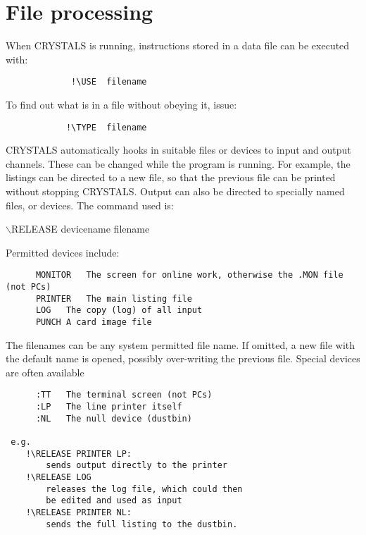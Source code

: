 \documentclass[10pt,a4paper]{report}
\begin{document}
\section{File processing}


When CRYSTALS is running, instructions stored in a data file can be executed
 with:

\small\begin{verbatim}
             !\USE  filename
\end{verbatim}\normalsize




To find out what is in a file without obeying it, issue:

\small\begin{verbatim}
            !\TYPE  filename
\end{verbatim}\normalsize




CRYSTALS automatically hooks in suitable files or devices to input and output
 channels. These can be changed while the program is running. For example, the
 listings can be directed to a new file, so that the previous file can be
 printed without stopping CRYSTALS. Output can also be directed to specially
 named files, or devices. The command used is:



$\backslash$RELEASE devicename filename


Permitted devices include:

\small\begin{verbatim}
      MONITOR   The screen for online work, otherwise the .MON file (not PCs)
      PRINTER   The main listing file
      LOG   The copy (log) of all input
      PUNCH A card image file
\end{verbatim}\normalsize




The filenames can be any system permitted file name.
 If omitted, a new file with the  default name is opened, possibly
 over-writing the previous file.
 Special devices are often available

\small\begin{verbatim}
      :TT   The terminal screen (not PCs)
      :LP   The line printer itself
      :NL   The null device (dustbin)

 e.g.
    !\RELEASE PRINTER LP:
        sends output directly to the printer
    !\RELEASE LOG
        releases the log file, which could then
        be edited and used as input
    !\RELEASE PRINTER NL:
        sends the full listing to the dustbin.
\end{verbatim}\normalsize
\end{document}
